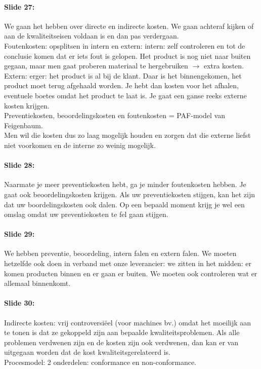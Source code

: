 \documentclass[10pt,a4paper]{report}
\begin{document}
\paragraph{Slide 27:} We gaan het hebben over directe en indirecte kosten. We gaan achteraf kijken of aan de kwaliteitseisen voldaan is en dan pas verdergaan.\\
Foutenkosten: opsplitsen in intern en extern: intern: zelf controleren en tot de conclusie komen dat er iets fout is gelopen. Het product is nog niet naar buiten gegaan, maar men gaat proberen materiaal te hergebruiken $\rightarrow$ extra kosten. Extern: erger: het product is al bij de klant. Daar is het binnengekomen, het product moet terug afgehaald worden. Je hebt dan kosten voor het afhalen, eventuele boetes omdat het product te laat is. Je gaat een ganse reeks externe kosten krijgen.\\
Preventiekosten, beoordelingskosten en foutenkosten = PAF-model van Feigenbaum. \\
Men wil die kosten dus zo laag mogelijk houden en zorgen dat die externe liefst niet voorkomen en de interne zo weinig mogelijk. 

\paragraph{Slide 28:} Naarmate je meer preventiekosten hebt, ga je minder foutenkosten hebben. Je gaat ook beoordelingskosten krijgen. Als uw preventiekosten stijgen, kan het zijn dat uw boordelingskosten ook dalen. Op een bepaald moment krijg je wel een omslag omdat uw preventiekosten te fel gaan stijgen. 

\paragraph{Slide 29:} We hebben preventie, beoordeling, intern falen en extern falen. We moeten hetzelfde ook doen in verband met onze leverancier: we zitten in het midden: er komen producten binnen en er gaan er buiten. We moeten ook controleren wat er allemaal binnenkomt. 

\paragraph{Slide 30:} Indirecte kosten: vrij controversi\"eel (voor machines bv.) omdat het moeilijk aan te tonen is dat ze gekoppeld zijn aan bepaalde kwaliteitsproblemen. Als alle problemen verdwenen zijn en de kosten zijn ook verdwenen, dan kan er van uitgegaan worden dat de kost kwaliteitsgerelateerd is. \\
Procesmodel: 2 onderdelen: conformance en non-conformance.
\end{document}
